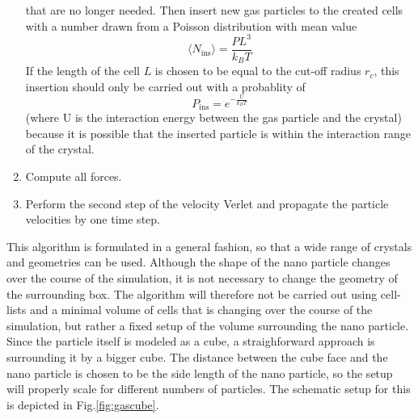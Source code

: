 \documentclass[12pt]{article}
\begin{document}
\begin{enumerate}
        that are no longer needed. Then insert new gas particles to the created cells with a number drawn from a Poisson distribution with mean value
        \begin{equation}
            \langle N_\text{ins}\rangle = \frac{PL^3}{k_BT}
        \end{equation}
        If the length of the cell $L$ is chosen to be equal to the cut-off radius $r_c$, this insertion should only be carried out with a probablity of
        \begin{equation}
            P_\text{ins} = e^{-\frac{U}{k_BT}}
        \end{equation}
        (where U is the interaction energy between the gas particle and the crystal) because it is possible that the inserted particle is 
        within the interaction range of the crystal. 
    \item Compute all forces.
    \item Perform the second step of the velocity Verlet and propagate the particle velocities by one time step. 
\end{enumerate}
This algorithm is formulated in a general fashion, so that a wide range of crystals and geometries can be used. 
Although the shape of the nano particle changes over the course of the simulation, it is not necessary to change the geometry of the surrounding box.
The algorithm will therefore not be carried out using cell-lists and a minimal volume of cells that is changing over the course of the simulation, 
but rather a fixed setup of the volume surrounding the nano particle.\\ 
Since the particle itself is modeled as a cube, a straighforward approach is surrounding it by a bigger cube. The distance between the cube face and the nano
particle is chosen to be the side length of the nano particle, so the setup will properly scale for different numbers of particles. 
The schematic setup for this is depicted in Fig.\ref{fig:gascube}.
\end{document}
